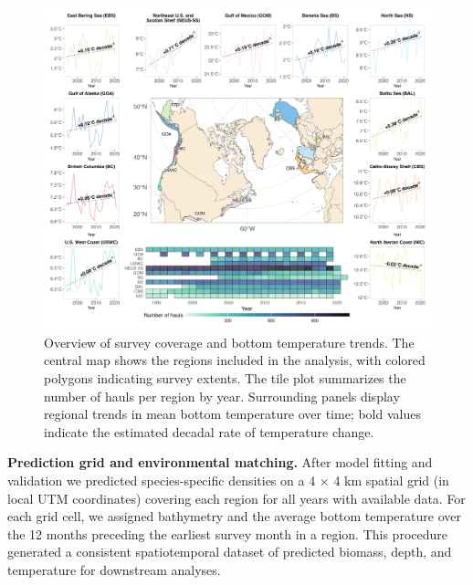 \documentclass[lineno,pdflatex,sn-nature]{sn-jnl}%
\theoremstyle{thmstyleone}%
\theoremstyle{thmstyletwo}%
\theoremstyle{thmstylethree}%
\begin{document}
\begin{figure}[h]
\centering
\includegraphics[width=1\textwidth]{output/figures/main/map.png}
\caption{Overview of survey coverage and bottom temperature trends.
The central map shows the regions included in the analysis, with colored polygons indicating survey extents. The tile plot summarizes the number of hauls per region by year. Surrounding panels display regional trends in mean bottom temperature over time; bold values indicate the estimated decadal rate of temperature change.}\label{fig:map}
\end{figure}

\textbf{Prediction grid and environmental matching.} 
After model fitting and validation we predicted species-specific densities on a 4 × 4 km spatial
grid (in local UTM coordinates) covering each region for all years with available data. For each grid cell, we assigned bathymetry and the average bottom temperature over the 12 months preceding the earliest survey month in a region. This procedure generated a consistent spatiotemporal dataset of predicted biomass, depth, and temperature for downstream analyses.
\end{document}
